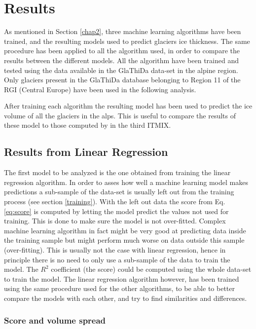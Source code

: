 \chapter{Results}\label{chap3}
\thispagestyle{plain}

As mentioned in Section \ref{chap2}, three machine learning algorithms have been trained, and the resulting models used to predict glaciers ice thickness. The same procedure has been applied to all the algorithm used, in order to compare the results between the different models. 
All the algorithm have been trained and tested using the data available in the GlaThiDa data-set in the alpine region. Only glaciers present in the GlaThiDa database belonging to Region 11 of the RGI (Central Europe) have been used in the following analysis.

After training each algorithm the resulting model has been used to predict the ice volume of all the glaciers in the alps. This is useful to compare the results of these model to those computed by \citet{Farinotti2019} in the third ITMIX.

\section{Results from Linear Regression}\label{linear}
The first model to be analyzed is the one obtained from training the linear regression algorithm. In order to asses how well a machine learning model makes predictions a sub-sample of the data-set is usually left out from the training process (see section \ref{training}). With the left out data the score from Eq. \ref{eq:score} is computed by letting the model predict the values not used for training. This is done to make sure the model is not over-fitted. Complex machine learning algorithm in fact might be very good at predicting data inside the training sample but might perform much worse on data outside this sample (over-fitting). 
This is usually not the case with linear regression, hence in principle there is no need to only use a sub-sample of the data to train the model. The $R^2$ coefficient (the score) could be computed using the whole data-set to train the model. The linear regression algorithm however, has been trained using the same procedure used for the other algorithms, to be able to better compare the models with each other, and try to find similarities and differences.     

\subsection{Score and volume spread}\label{lr-score}

